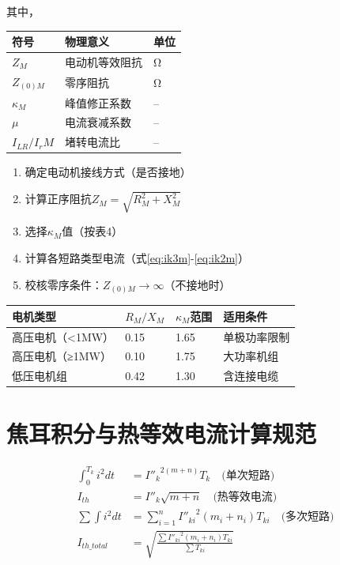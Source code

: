\documentclass[a4paper,11pt,AutoFakeBold]{ctexart}
\begin{document}
其中，

\begin{tabular}{lll}
符号 & 物理意义 & 单位 \\
\hline
$Z_M$ & 电动机等效阻抗 & \si{\ohm} \\
$Z_{(0)M}$ & 零序阻抗 & \si{\ohm} \\
$\kappa_M$ & 峰值修正系数 & -- \\
$\mu$ & 电流衰减系数 & -- \\
$I_{LR}/I_rM$ & 堵转电流比 & -- \\
\end{tabular}


\begin{enumerate}
\item 确定电动机接线方式（是否接地）
\item 计算正序阻抗$Z_M = \sqrt{R_M^2 + X_M^2}$
\item 选择$\kappa_M$值（按表4）
\item 计算各短路类型电流（式\ref{eq:ik3m}-\ref{eq:ik2m}）
\item 校核零序条件：$Z_{(0)M} \rightarrow \infty$（不接地时）
\end{enumerate}

\begin{tabular}{llll}
电机类型 & $R_M/X_M$ & $\kappa_M$范围 & 适用条件 \\
\hline
高压电机（<1MW） & 0.15 & 1.65 & 单极功率限制 \\
高压电机（≥1MW） & 0.10 & 1.75 & 大功率机组 \\
低压电机组 & 0.42 & 1.30 & 含连接电缆 \\
\end{tabular}

\newpage
\section{焦耳积分与热等效电流计算规范}
\begin{align}
\int_0^{T_k}i^2dt &= {I''_k}^{2(m+n)}T_k \quad \text{(单次短路)} \label{eq:joule_single} \\
I_{th} &= I''_k\sqrt{m+n} \quad \text{(热等效电流)} \label{eq:ith} \\
\sum\int i^2dt &= \sum_{i=1}^n {I''_{ki}}^2(m_i+n_i)T_{ki} \quad \text{(多次短路)} \label{eq:joule_multi} \\
I_{th\_total} &= \sqrt{\frac{\sum {I''_{ki}}^2(m_i+n_i)T_{ki}}{\sum T_{ki}}} \label{eq:ith_total}
\end{align}
\end{document}
